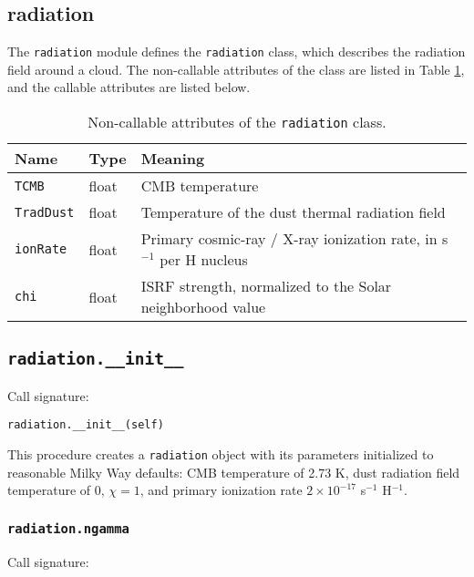 \documentclass[12pt]{article}
\begin{document}
\clearpage

\subsection{radiation}

The \verb=radiation= module defines the \verb=radiation= class, which describes the radiation field around a cloud. The non-callable attributes of the class are listed in Table \ref{tab:rad}, and the callable attributes are listed below.

\begin{table}
\begin{center}
\begin{tabular}{lll}
\hline\hline
Name & Type & Meaning \\
\hline\hline
\texttt{TCMB} & float & CMB temperature \\
\texttt{TradDust} & float & Temperature of the dust thermal radiation field \\
\texttt{ionRate} & float & Primary cosmic-ray / X-ray ionization rate, in s$^{-1}$ per H nucleus \\
\texttt{chi} & float & ISRF strength, normalized to the Solar neighborhood value \\
\hline
\end{tabular}
\caption{
\label{tab:rad}
Non-callable attributes of the \texttt{radiation} class.
}
\end{center}
\end{table}

\subsection{\texttt{radiation.\_\_init\_\_}}

Call signature:

\begin{verbatim}
radiation.__init__(self)
\end{verbatim}

This procedure creates a \verb=radiation= object with its parameters initialized to reasonable Milky Way defaults: CMB temperature of 2.73 K, dust radiation field temperature of 0, $\chi = 1$, and primary ionization rate $2\times 10^{-17}$ s$^{-1}$ H$^{-1}$.

\subsubsection{\texttt{radiation.ngamma}}

Call signature:
\end{document}
